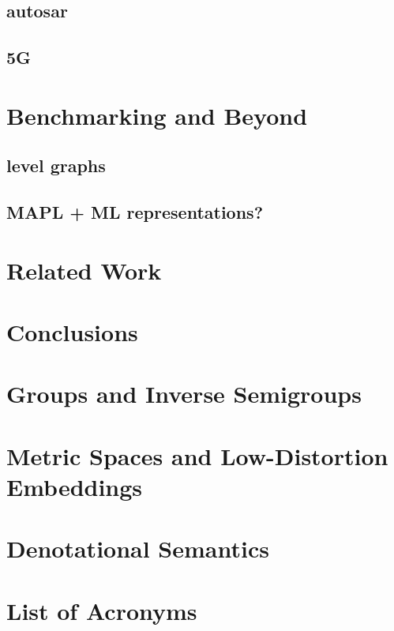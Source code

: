 \documentclass{report}
\begin{document}
\section{autosar}
\section{5G}

\chapter{Benchmarking and Beyond}
\section{level graphs}
\section{MAPL + ML representations?}

\chapter{Related Work}


\chapter{Conclusions} 

\appendix
\chapter{Groups and Inverse Semigroups}
\label{appendix:groups}

\chapter{Metric Spaces and Low-Distortion Embeddings}
\label{appendix:metric}

\chapter{Denotational Semantics}
\label{appendix:semantics}





\listoffigures

\printindex

\chapter*{List of Acronyms}

\clearpage
\end{document}
